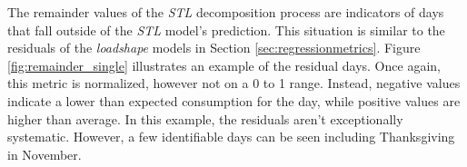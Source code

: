 The remainder values of the \emph{STL} decomposition process are indicators of days that fall outside of the \emph{STL} model's prediction. This situation is similar to the residuals of the \emph{loadshape} models in Section \ref{sec:regressionmetrics}. Figure \ref{fig:remainder_single} illustrates an example of the residual days. Once again, this metric is normalized, however not on a 0 to 1 range. Instead, negative values indicate a lower than expected consumption for the day, while positive values are higher than average. In this example, the residuals aren't exceptionally systematic. However, a few identifiable days can be seen including Thanksgiving in November.